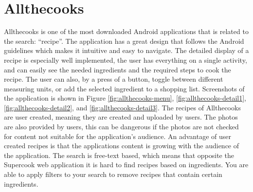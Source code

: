 \section{Allthecooks}
Allthecooks is one of the most downloaded \cite{allthecooks-googleplay} Android applications that is related to the search: ``recipe''. The application has a great design that follows the Android guidelines\cite{guidelines-appstructure} which makes it intuitive and easy to navigate. The detailed display of a recipe is especially well implemented, the user has everything on a single activity, and can easily see the needed ingredients and the required steps to cook the recipe. The user can also, by a press of a button, toggle between different measuring units, or add the selected ingredient to a shopping list. Screenshots of the application is shown in Figure \ref{fig:allthecooks-menu}, \ref{fig:allthecooks-detail1}, \ref{fig:allthecooks-detail2}, and \ref{fig:allthecooks-detail3}.
The recipes of Allthecooks are user created, meaning they are created and uploaded by users. The photos are also provided by users, this can be dangerous if the photos are not checked for content not suitable for the application's audience. An advantage of user created recipes is that the applications content is growing with the audience of the application.
The search is free-text based, which means that opposite the Supercook web application it is hard to find recipes based on ingredients. You are able to apply filters to your search to remove recipes that contain certain ingredients.

